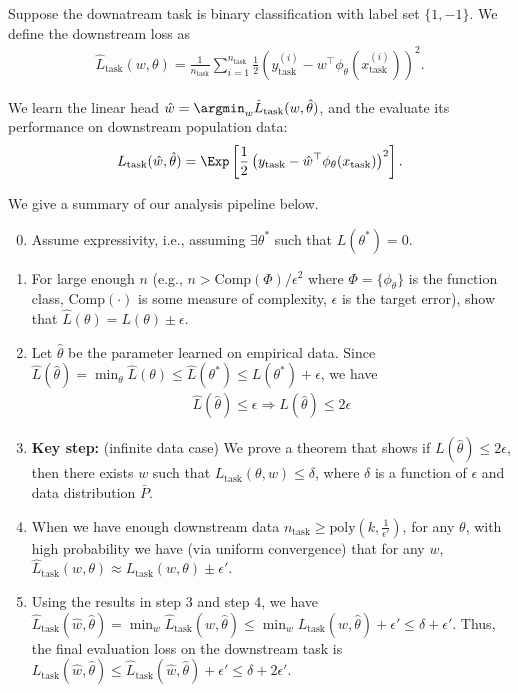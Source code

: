 Suppose the downatream task is binary classification with label set $\{1, -1\}$. We define the downstream loss as 
\begin{align}
	\hat{L}_{\text{task}}(w, \theta) = \frac{1}{n_{\text{task}}} \sum_{i=1}^{n_{\text{task}}} \frac{1}{2} \left(y^{(i)}_{\text{task}} - w^\top \phi_{{\theta}}(x^{(i)}_{\text{task}})\right)^2.
\end{align}

We learn the linear head $\hat{w} = \argmin_w \hat{L}_{\text{task}}(w, \hat{\theta})$, and the evaluate its performance on downstream population data:
\begin{align}
	L_{\text{task}}(\hat{w}, \hat{\theta}) = \Exp\left[\frac{1}{2} \left(y_{\text{task}} - \hat{w}^\top \phi_{{\theta}}(x_{\text{task}})\right)^2\right].
\end{align}

We give a summary of our analysis pipeline below. 
\begin{enumerate}\setcounter{enumi}{-1}
\item{Assume expressivity, i.e., assuming $\exists \theta^*$ such that $L(\theta^*)=0$.}
\item{For large enough $n$ (e.g., $n>\text{Comp}({\Phi})/\epsilon^2$ where ${\Phi}=\{\phi_\theta\}$ is the function class, $\text{Comp}(\cdot)$ is some measure of complexity, $\epsilon$ is the target error), show that $\hat{L}(\theta) = L(\theta) \pm \epsilon$.}
\item{Let $\hat{\theta}$ be the parameter learned on empirical data. Since $\hat{L}(\hat{\theta})=\min_{\theta}\hat{L}(\theta) \le \hat{L}(\theta^*) \le L(\theta^*)+\epsilon$, we have
\begin{align}
	\hat{L}(\hat{\theta})\le\epsilon \Rightarrow L(\hat{\theta}) \le 2\epsilon
\end{align}
}
\item{\textbf{Key step:} (infinite data case) We prove a theorem that shows if $L(\hat{\theta})\le2\epsilon$, then there exists $w$ such that $L_{\text{task}}(\theta, w)\le \delta$, where $\delta$ is a function of $\epsilon$ and data distribution $\bar{P}$.}
\item{When we have enough downstream data $n_{\text{task}}\ge\text{poly}(k, \frac{1}{\epsilon'})$, for any $\theta$, with high probability we have (via uniform convergence) that for any $w$, 
$	\hat{L}_{\text{task}}(w, \theta) \approx L_{\text{task}}(w, \theta)\pm \epsilon'$. }
\item{Using the results in step 3 and step 4, we have $\hat{L}_{\text{task}}(\hat{w}, \hat{\theta}) = \min_{w} \hat{L}_{\text{task}}(w, \hat{\theta}) \le \min_w L_{\text{task}}(w, \hat{\theta}) + \epsilon' \le \delta + \epsilon'$. Thus, the final evaluation loss on the downstream task is $L_{\text{task}}(\hat{w}, \hat{\theta}) \le \hat{L}_{\text{task}}(\hat{w}, \hat{\theta}) +\epsilon' \le \delta + 2\epsilon'$. }
\end{enumerate}

